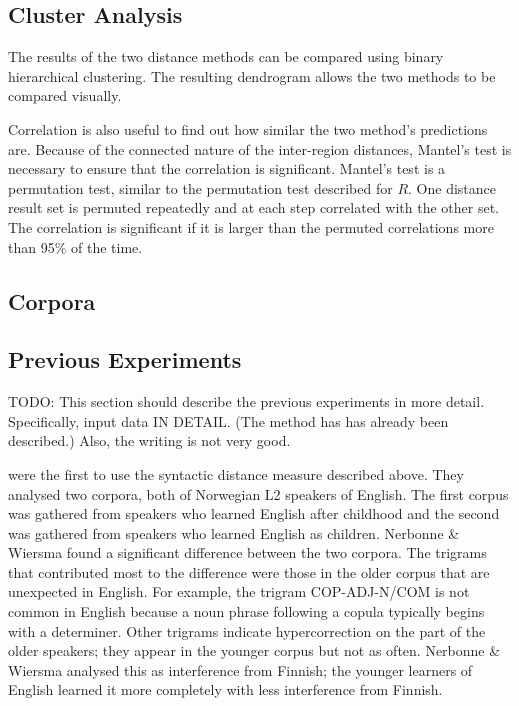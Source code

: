 \documentclass[11pt]{article}
\begin{document}
\subsection{Cluster Analysis}

The results of the two distance methods can be compared using
binary hierarchical clustering. The resulting dendrogram allows the two
methods to be compared visually.

Correlation is also useful to find out how similar the two method's
predictions are. Because of the connected nature of the inter-region
distances, Mantel's test is necessary to ensure that the correlation
is significant. Mantel's test is a permutation test, similar to the
permutation test described for $R$. One distance result set is
permuted repeatedly and at each step correlated with the other
set. The correlation is significant if it is larger than the permuted
correlations more than 95\% of the time.

\subsection{Corpora}

\subsection{Previous Experiments}

TODO: This section should describe the previous experiments in more
detail. Specifically, input data IN DETAIL. (The method has has
already been described.) Also, the writing is not very good.

 were the first to use the syntactic distance
measure described above. They analysed two corpora, both of Norwegian
L2 speakers of English. The first corpus was gathered from speakers
who learned English after childhood and the second was gathered from
speakers who learned English as children. Nerbonne \& Wiersma found a
significant difference between the two corpora. The trigrams that
contributed most to the difference were those in the older corpus that
are unexpected in English. For example, the trigram COP-ADJ-N/COM is
not common in English because a noun phrase following a copula
typically begins with a determiner. Other trigrams indicate
hypercorrection on the part of the older speakers; they appear in the
younger corpus but not as often. Nerbonne \& Wiersma analysed this as
interference from Finnish; the younger learners of English learned it
more completely with less interference from Finnish.
\end{document}
